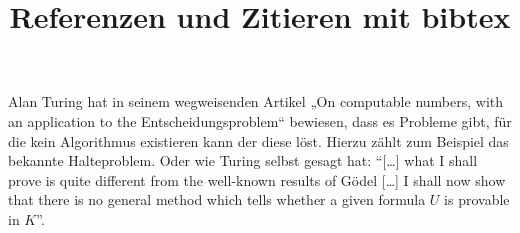 \documentclass[a4paper]{scrartcl}
\title{Referenzen und Zitieren mit bibtex}
\author{}
\date{}
\begin{document}
\maketitle

Alan Turing hat in seinem wegweisenden Artikel „On computable numbers, with an application to the Entscheidungsproblem“ \cite{turing1937computable} bewiesen, dass es Probleme gibt, für die kein Algorithmus existieren kann der diese löst.
Hierzu zählt zum Beispiel das bekannte Halteproblem.
Oder wie Turing selbst gesagt hat:
\enquote{[\dots] what I shall prove is quite different from the well-known results of Gödel [\dots] I shall now show that there is no general method which tells whether a given formula \(U\) is provable in \(K\)}.



\end{document}
